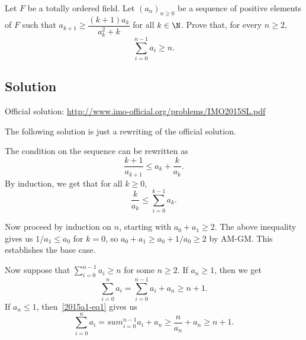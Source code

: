 Let $F$ be a totally ordered field.
Let $(a_n)_{n \geq 0}$ be a sequence of positive elements of $F$ such that $a_{k + 1} \geq \dfrac{(k + 1) a_k}{a_k^2 + k}$ for all $k \in \N$.
Prove that, for every $n \geq 2$,
\[ \sum_{i = 0}^{n - 1} a_i \geq n. \] 



\subsection*{Solution}

Official solution: \url{http://www.imo-official.org/problems/IMO2015SL.pdf}

The following solution is just a rewriting of the official solution.

The condition on the sequence can be rewritten as
\[ \frac{k + 1}{a_{k + 1}} \leq a_k + \frac{k}{a_k}. \]
By induction, we get that for all $k \geq 0$,
\[ \frac{k}{a_k} \leq \sum_{i = 0}^{k - 1} a_k. \tag{1}\label{2015a1-eq1} \]

Now proceed by induction on $n$, starting with $a_0 + a_1 \geq 2$.
The above inequality gives us $1/a_1 \leq a_0$ for $k = 0$, so $a_0 + a_1 \geq a_0 + 1/a_0 \geq 2$ by AM-GM.
This establishes the base case.

Now suppose that $\displaystyle \sum_{i = 0}^{n - 1} a_i \geq n$ for some $n \geq 2$.
If $a_n \geq 1$, then we get
\[ \sum_{i = 0}^n a_i = \sum_{i = 0}^{n - 1} a_i + a_n \geq n + 1. \]
If $a_n \leq 1$, then~\eqref{2015a1-eq1} gives us
\[ \sum_{i = 0}^n a_i = sum_{i = 0}^{n - 1} a_i + a_n \geq \frac{n}{a_n} + a_n \geq n + 1. \]
